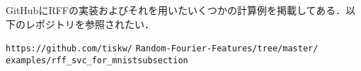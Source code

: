 %

GitHubにRFFの実装およびそれを用いたいくつかの計算例を掲載してある．以下のレポジトリを参照されたい．

\verb|https://github.com/tiskw/|
\mbox{}\hspace*{20pt}\verb|Random-Fourier-Features/tree/master/|
\mbox{}\hspace*{30pt}\verb|examples/rff_svc_for_mnistsubsection|

